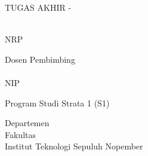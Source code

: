 \begin{large}
  TUGAS AKHIR - \coursecode{}
\end{large}

\vspace{\fill}

\begin{spacing}{1.5}
  \begin{Large}
    \tatitle{}
  \end{Large}
\end{spacing}

\vspace{\fill}

\begin{large}
  \name{} \\
  \textmd{NRP \nrp{}}
\end{large}

\vspace{\fill}

\begin{large}
  \textmd{Dosen Pembimbing} \\
  \advisor{} \\
  \textmd{NIP \advisornip{}} \\

\end{large}

\vspace{\fill}

Program Studi Strata 1 (S1) \studyprogram{} \\

\mdseries

Departemen \department{} \\
Fakultas \faculty{} \\
Institut Teknologi Sepuluh Nopember

\place{} \\ \the\year{}
